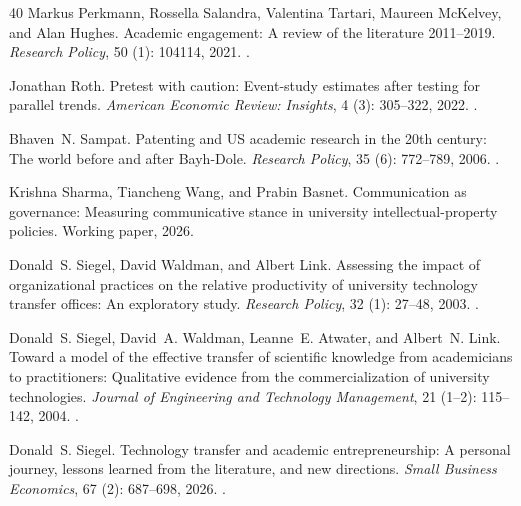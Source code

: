 \begin{thebibliography}{40}
Markus Perkmann, Rossella Salandra, Valentina Tartari, Maureen McKelvey, and
  Alan Hughes.
\newblock Academic engagement: A review of the literature 2011--2019.
\newblock \emph{Research Policy}, 50 (1): 104114, 2021.
\newblock {}.

Jonathan Roth.
\newblock Pretest with caution: Event-study estimates after testing for
  parallel trends.
\newblock \emph{American Economic Review: Insights}, 4 (3):
  305--322, 2022.
\newblock {}.

Bhaven~N. Sampat.
\newblock Patenting and {US} academic research in the 20th century: The world
  before and after {Bayh-Dole}.
\newblock \emph{Research Policy}, 35 (6): 772--789, 2006.
\newblock {}.

Krishna Sharma, Tiancheng Wang, and Prabin Basnet.
\newblock Communication as governance: Measuring communicative stance in
  university intellectual-property policies.
\newblock Working paper, 2026.

Donald~S. Siegel, David Waldman, and Albert Link.
\newblock Assessing the impact of organizational practices on the relative
  productivity of university technology transfer offices: An exploratory study.
\newblock \emph{Research Policy}, 32 (1): 27--48, 2003.
\newblock {}.

Donald~S. Siegel, David~A. Waldman, Leanne~E. Atwater, and Albert~N. Link.
\newblock Toward a model of the effective transfer of scientific knowledge from
  academicians to practitioners: Qualitative evidence from the
  commercialization of university technologies.
\newblock \emph{Journal of Engineering and Technology Management}, 21
  (1--2): 115--142, 2004.
\newblock {}.

Donald~S. Siegel.
\newblock Technology transfer and academic entrepreneurship: A personal
  journey, lessons learned from the literature, and new directions.
\newblock \emph{Small Business Economics}, 67 (2): 687--698,
  2026.
\newblock {}.


\end{thebibliography}

